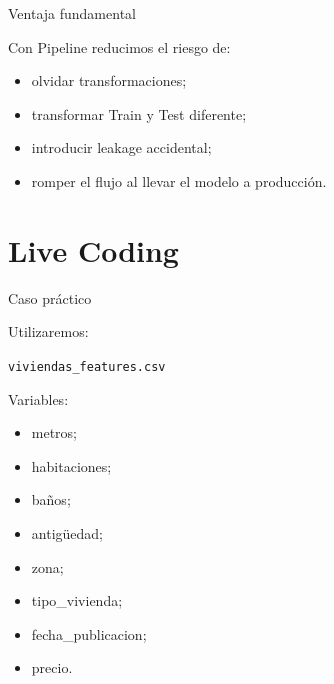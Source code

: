 \documentclass[aspectratio=169,11pt]{beamer}
\begin{document}

\begin{frame}{Ventaja fundamental}

Con Pipeline reducimos el riesgo de:

\begin{itemize}

    \item olvidar transformaciones;

    \item transformar Train y Test diferente;

    \item introducir leakage accidental;

    \item romper el flujo al llevar el modelo a producción.

\end{itemize}

\end{frame}

\section{Live Coding}

\begin{frame}{Caso práctico}

Utilizaremos:

\begin{center}

\Large
\texttt{viviendas\_features.csv}
\end{center}

Variables:

\begin{itemize}

    \item metros;

    \item habitaciones;

    \item baños;

    \item antigüedad;

    \item zona;

    \item tipo\_vivienda;

    \item fecha\_publicacion;

    \item precio.

\end{itemize}

\end{frame}
\end{document}
